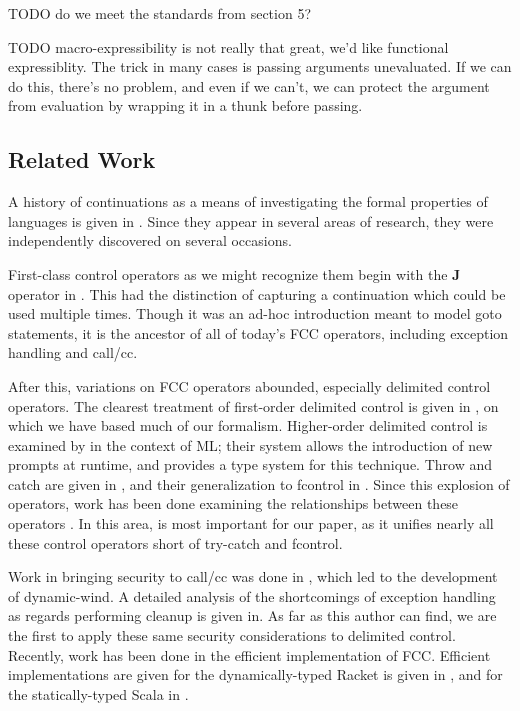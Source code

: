 \documentclass[11pt]{article}
\begin{document}
TODO do we meet the standards from section 5?

TODO macro-expressibility is not really that great, we'd like functional expressiblity.
The trick in many cases is passing arguments unevaluated. If we can do this, there's no problem, and even if we can't, we can protect the argument from evaluation by wrapping it in a thunk before passing.

\subsection{Related Work}

A history of continuations as a means of investigating the formal properties of languages is given in \cite{DiscoverContinuations}.
Since they appear in several areas of research, they were independently discovered on several occasions.

First-class control operators as we might recognize them begin with the \textbf{J} operator in \cite{ISWIM}.
This had the distinction of capturing a continuation which could be used multiple times.
Though it was an ad-hoc introduction meant to model goto statements, it is the ancestor of all of today's FCC operators, including exception handling and call/cc.

After this, variations on FCC operators abounded, especially delimited control operators.
The clearest treatment of first-order delimited control is given in \cite{PromptApplication}, on which we have based much of our formalism.
Higher-order delimited control is examined by \cite{Gunter:1995} in the context of ML; their system allows the introduction of new prompts at runtime, and provides a type system for this technique.
Throw and catch are given in \cite{InterpreterForScheme}, and their generalization to fcontrol in \cite{HandlingControl}.
Since this explosion of operators, work has been done examining the relationships between these operators \cite{ControlDelimitersHierarchy}\cite{Filinski94}\cite{DelimDynBinding}\cite{GreatEscape}.
In this area, \cite{MFDC} is most important for our paper, as it unifies nearly all these control operators short of try-catch and fcontrol.

Work in bringing security to call/cc was done in \cite{continuationsInProcObjs}, which led to the development of dynamic-wind.
A detailed analysis of the shortcomings of exception handling as regards performing cleanup is given in\cite{WeimerNecula08}.
As far as this author can find, we are the first to apply these same security considerations to delimited control.
Recently, work has been done in the efficient implementation of FCC.
Efficient implementations are given for the dynamically-typed Racket is given in \cite{RacketImplFCC}, and for the statically-typed Scala in \cite{ScalaImplFCC}.
\end{document}
